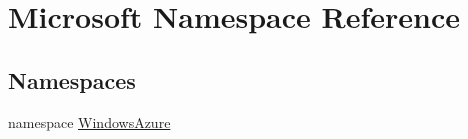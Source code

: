 \hypertarget{namespaceMicrosoft}{}\section{Microsoft Namespace Reference}
\label{namespaceMicrosoft}
\subsection*{Namespaces}
\begin{DoxyCompactItemize}
\item 
namespace \hyperlink{namespaceMicrosoft_1_1WindowsAzure}{Windows\+Azure}
\end{DoxyCompactItemize}
